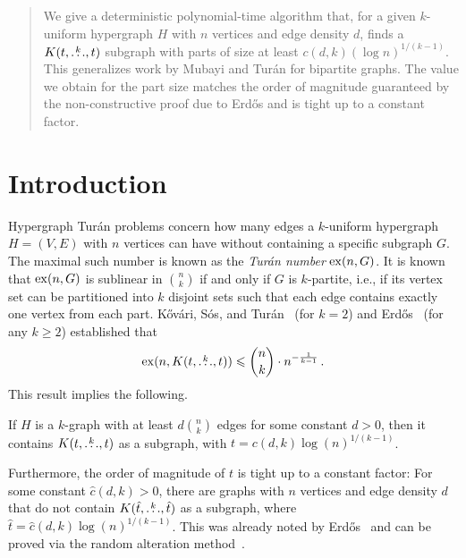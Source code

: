 \maketitle

\begin{abstract}
We give a deterministic polynomial-time algorithm that, for a given $k$-uniform hypergraph $H$ with $n$ vertices and edge density $d$,
finds a $K(t, \overset{k}{\dots}, t)$ subgraph with parts of size at least ${c(d, k)(\log n)^{1/(k-1)}}$.
This generalizes work by Mubayi and Tur\'{a}n for bipartite graphs.
The value we obtain for the part size matches the order of magnitude guaranteed by the non-constructive proof due to
Erd\H{o}s and is tight up to a constant factor.
\end{abstract}

\section{Introduction}\label{sec:introduction}

Hypergraph Tur\'{a}n problems concern how many edges a $k$-uniform hypergraph $H = (V, E)$ with $n$ vertices can have without containing a specific subgraph $G$.
The maximal such number is known as the \emph{Tur\'{a}n number} $\mathrm{ex}(n, G)$.
It is known~\cite{keevash2011hypergraph}
that $\mathrm{ex}(n, G)$ is sublinear in $\binom{n}{k}$ if and only if $G$ is $k$-partite, i.e.,
if its vertex set can be partitioned into $k$ disjoint sets such that each edge contains exactly one vertex from each part.
Kőv\'{a}ri, S\'{o}s, and Tur\'{a}n~\cite{Kovari1954} (for $k=2$) and
Erd\H{o}s~\cite{Erods1964} (for any $k \geq 2$) established that
\[ \label{eq:erdos64-intro}
    \mathrm{ex}(n, K(t, \overset{k}{\dots}, t)) \leqslant \binom{n}{k} \cdot n^{-\frac{1}{k-1}}\,.
\]
This result implies the following.

\begin{remark} \label{rk:order}
    If $H$ is a $k$-graph with at least $d \binom{n}{k}$ edges for some constant $d > 0$, then it contains $K(t, \overset{k}{\dots}, t)$
    as a subgraph, with $t = c(d, k) \log(n)^{1/(k-1)}$.
\end{remark}

Furthermore, the order of magnitude of $t$ is tight up to a constant factor:
For some constant $\hat{c}(d, k) > 0$,
there are graphs with $n$ vertices and edge density
$d$ that do not contain $K(\hat{t}, \overset{k}{\dots}, \hat{t})$ as a subgraph, where
$\hat{t} = \hat{c}(d, k)\log(n)^{1/(k-1)}$.
This was already noted by Erd\H{o}s~\cite{Erods1964} and can be proved via the random alteration method~\cite{alon2016probabilistic}.


